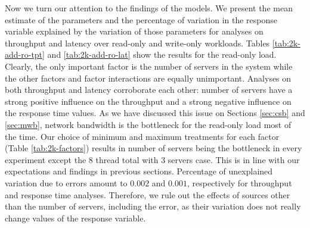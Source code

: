 \documentclass[11pt,a4paper]{article}
\begin{document}
\par Now we turn our attention to the findings of the models. We present the mean estimate of the parameters and the percentage of variation in the response variable explained by the variation of those parameters for analyses on throughput and latency over read-only and write-only workloads. Tables \ref{tab:2k-add-ro-tpt} and \ref{tab:2k-add-ro-lat} show the results for the read-only load. Clearly, the only important factor is the number of servers in the system while the other factors and factor interactions are equally unimportant. Analyses on both throughput and latency corroborate each other: number of servers have a strong positive influence on the throughput and a strong negative influence on the response time values. As we have discussed this issue on Sections \ref{sec:csb} and \ref{sec:mwb}, network bandwidth is the bottleneck for the read-only load most of the time. Our choice of minimum and maximum treatments for each factor (Table \ref{tab:2k-factors}) results in number of servers being the bottleneck in every experiment except the 8 thread total with 3 servers case. This is in line with our expectations and findings in previous sections. Percentage of unexplained variation due to errors amount to $0.002$ and $0.001$, respectively for throughput and response time analyses. Therefore, we rule out the effects of sources other than the number of servers, including the error, as their variation does not really change values of the response variable.
\end{document}
